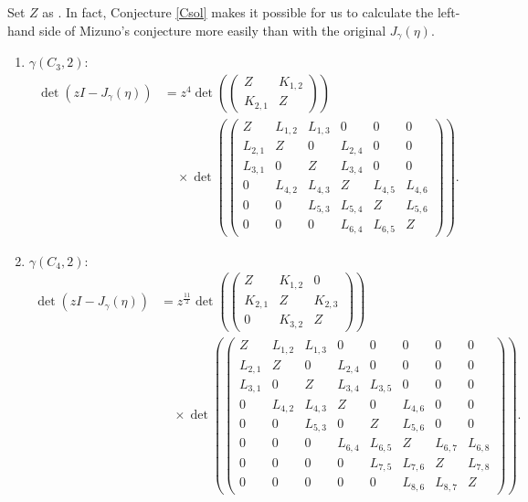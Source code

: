 \documentclass[pdftex]{sigma}
\numberwithin{equation}{section}
\begin{document}
	\begin{Example}
Set $Z$ as .
In fact, Conjecture \ref{Csol} makes it possible for us to calculate the left-hand side of Mizuno's conjecture more easily than with the original $J_\gamma(\eta)$.
		\begin{enumerate}\itemsep=0pt
			\item $\gamma(C_3,2)$:
				\begin{align*}
				\det (zI-J_\gamma(\eta))&{}=z^4\det \left(\begin{pmatrix}
					Z&K_{1,2}\\
					K_{2,1}&Z
				\end{pmatrix}\right)\\
				&\quad{}\times\det \left(\begin{pmatrix}
					Z&L_{1,2}&L_{1,3}&0&0&0\\%
					L_{2,1}&Z&0&L_{2,4}&0&0\\%
					L_{3,1}&0&Z&L_{3,4}&0&0\\%
					0&L_{4,2}&L_{4,3}&Z&L_{4,5}&L_{4,6}\\%
					0&0&L_{5,3}&L_{5,4}&Z&L_{5,6}\\%
					0&0&0&L_{6,4}&L_{6,5}&Z%
				\end{pmatrix}\right).
				\end{align*}
			\item $\gamma(C_4,2)$:
				\begin{align*}
				\det (zI-J_\gamma(\eta))&{}=z^\frac{11}{2}\det \left(\begin{pmatrix}
					Z&K_{1,2}&0\\
					K_{2,1}&Z&K_{2,3}\\
					0&K_{3,2}&Z
				\end{pmatrix}\right)\\
				&\quad{}\times\det \left(\begin{pmatrix}
					Z&L_{1,2}&L_{1,3}&0&0&0&0&0\\%
					L_{2,1}&Z&0&L_{2,4}&0&0&0&0\\%
					L_{3,1}&0&Z&L_{3,4}&L_{3,5}&0&0&0\\%
					0&L_{4,2}&L_{4,3}&Z&0&L_{4,6}&0&0\\%
					0&0&L_{5,3}&0&Z&L_{5,6}&0&0\\%
					0&0&0&L_{6,4}&L_{6,5}&Z&L_{6,7}&L_{6,8}\\%
					0&0&0&0&L_{7,5}&L_{7,6}&Z&L_{7,8}\\%
					0&0&0&0&0&L_{8,6}&L_{8,7}&Z%
				\end{pmatrix}\right).
				\end{align*}
		\end{enumerate}
	\end{Example}
\end{document}
